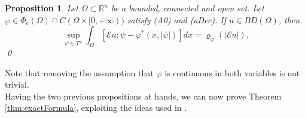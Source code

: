 \documentclass[a4paper,11pt,oneside,notitlepage]{article}
\newtheorem{proposition}[theorem]{Proposition}
\numberwithin{equation}{section}
\def\R{\mathbb{R}}
\newcommand{\vphi}{\varphi}
\newcommand{\vrho}{\varrho}
\newcommand{\E}{\mathcal{E}}
\begin{document}
\begin{proposition}
\label{prop:exactFormulaAC}
    Let $\Omega \subset \R^n$ be a bounded, connected and open set. Let $\vphi \in \Phi_c(\Omega) \cap C(\Omega \times [0,+\infty))$ satisfy (A0) and (aDec).
    If $u \in BD(\Omega)$, then 
    \begin{equation*}
        \sup_{\psi \in T^\vphi} \int_\Omega \left[\E u : \psi - \vphi^*(x,|\psi|) \right] dx = \vrho_\vphi(|\E u|).
    \end{equation*}
    \qed
\end{proposition}

Note that removing the assumption that $\vphi$ is continuous in both variables is not trivial.
\\
Having the two previous propositions at hands, we can now prove Theorem \ref{thm:exactFormula}, exploiting the ideas used in \cite[Theorem 6.4]{EHH}.
\end{document}
